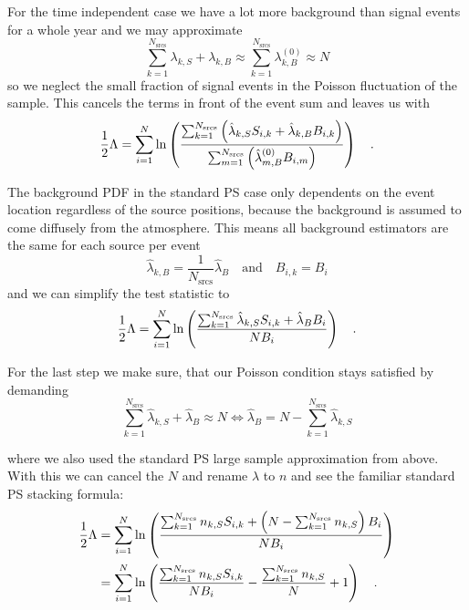 For the time independent case we have a lot more background than signal events for a whole year and we may approximate
\begin{equation}
  \sum_{k=1}^{N_\text{srcs}} \lambda_{k,S} + \lambda_{k,B} \approx
  \sum_{k=1}^{N_\text{srcs}} \lambda_{k,B}^{(0)} \approx N
\end{equation}
so we neglect the small fraction of signal events in the Poisson fluctuation of the sample.
This cancels the terms in front of the event sum and leaves us with
\begin{equation}
  \frac{1}{2}\Lambda
  = \sum_{i=1}^N \ln\left(
      \frac{\sum_{k=1}^{N_\text{srcs}}\left(
          \hat{\lambda}_{k,S} S_{i,k}+\hat{\lambda}_{k,B} B_{i,k}\right)}
          {\sum_{m=1}^{N_\text{srcs}}\left(
            \hat{\lambda}_{m,B}^{(0)} B_{i,m}
          \right)}
        \right)
  \quad\text{.}
\end{equation}

The background PDF in the standard PS case only dependents on the event location regardless of the source positions, because the background is assumed to come diffusely from the atmosphere.
This means all background estimators are the same for each source per event
\begin{equation}
  \hat{\lambda}_{k,B} = \frac{1}{N_\text{srcs}} \hat{\lambda}_B
  \quad\text{and}\quad
  B_{i,k} = B_i
\end{equation}
and we can simplify the test statistic to
\begin{equation}
  \frac{1}{2}\Lambda
  = \sum_{i=1}^N\ln\left(
      \frac{\sum_{k=1}^{N_\text{srcs}}\hat{\lambda}_{k,S} S_{i,k} +
            \hat{\lambda}_{B} B_i}
           {N B_i}
    \right)
  \quad\text{.}
\end{equation}

For the last step we make sure, that our Poisson condition stays satisfied by demanding
\begin{equation}
  \sum_{k=1}^{N_\text{srcs}}\hat{\lambda}_{k,S} + \hat{\lambda}_B \approx N
  \Leftrightarrow
  \hat{\lambda}_B = N - \sum_{k=1}^{N_\text{srcs}}\hat{\lambda}_{k,S}
\end{equation}

where we also used the standard PS large sample approximation from above.
With this we can cancel the $N$ and rename $\lambda$ to $n$ and see the familiar standard PS stacking formula:
\begin{align}
  \frac{1}{2}\Lambda
  &= \sum_{i=1}^N\ln\left(
      \frac{\sum_{k=1}^{N_\text{srcs}}n_{k,S} S_{i,k} +
            \left(N-\sum_{k=1}^{N_\text{srcs}}n_{k,S}\right) B_i}
           {N B_i}
    \right)  \\
  &= \sum_{i=1}^N\ln\left(
      \frac{\sum_{k=1}^{N_\text{srcs}}n_{k,S} S_{i,k}}
           {N B_i} -
      \frac{\sum_{k=1}^{N_\text{srcs}}n_{k,S}}{N} + 1
    \right)
  \quad\text{.}
\end{align}

